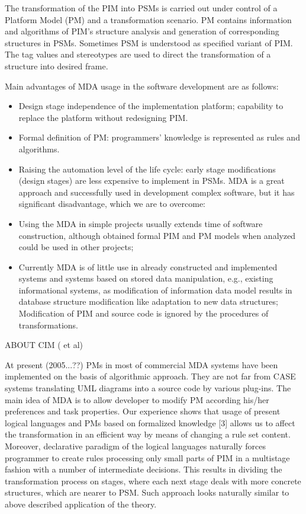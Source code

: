 \documentclass{intech}
\begin{document}
The transformation of the PIM into PSMs is carried out under control of a Platform Model (PM) and a transformation scenario. PM contains information and algorithms of PIM’s structure analysis and generation of corresponding structures in PSMs. Sometimes PSM is understood as specified variant of PIM. The tag values and stereotypes are used to direct the transformation of a structure into desired frame.

Main advantages of MDA usage in the software development are as follows:
\begin{itemize}
\item Design stage independence of the implementation platform; capability to replace the platform without redesigning PIM.

\item Formal definition of PM: programmers’ knowledge is
represented as rules and algorithms.

\item Raising the automation level of the life cycle: early stage modifications (design stages) are less expensive to implement in PSMs. MDA is a great approach and successfully used in development complex software, but it has significant disadvantage, which we are to overcome:

\item Using the MDA in simple projects usually extends time of software construction, although obtained formal PIM and PM models when analyzed could be used in other projects;

\item Currently MDA is of little use in already constructed and implemented systems and systems based on stored data manipulation, e.g., existing informational systems, as modification of information data model results in database structure modification like adaptation to new data structures; Modification of PIM and source code is ignored by the procedures of transformations.
\end{itemize}

ABOUT CIM (\cite{jurin} et al)

At present (2005...??) PMs in most of commercial MDA systems have been implemented on the basis of algorithmic approach. They are not far from CASE systems translating UML diagrams into a source code by various plug-ins. The main idea of MDA is to allow developer to modify PM according his/her preferences and task properties. Our experience shows that usage of present logical languages and PMs based on formalized knowledge [3] allows us to affect the transformation in an efficient way by means of changing a rule set content. Moreover, declarative paradigm of the logical languages naturally forces programmer to create rules processing only small parts of PIM in a multistage fashion with a number of intermediate decisions. This results in dividing the transformation process on stages, where each next stage deals with more concrete structures, which are nearer to PSM. Such approach looks naturally similar to above described application of the theory.
\end{document}
